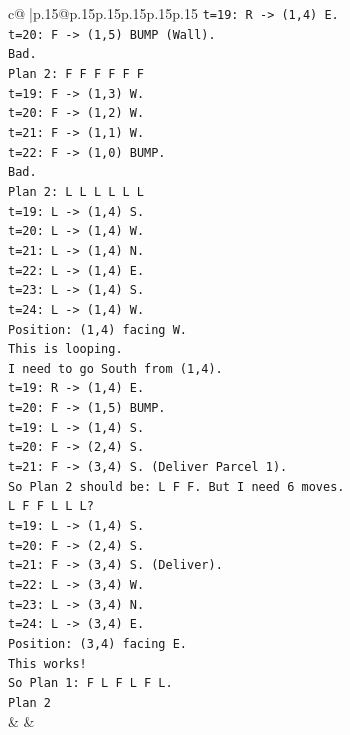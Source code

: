 \documentclass{article}
\begin{document}
{\begin{supertabular}{c@{$\;$}|p{.15\linewidth}@{}p{.15\linewidth}p{.15\linewidth}p{.15\linewidth}p{.15\linewidth}p{.15\linewidth}}
{{{\texttt{t=19: R {-}> (1,4) E.} \\
\texttt{t=20: F {-}> (1,5) BUMP (Wall).} \\
\texttt{Bad.} \\
\texttt{Plan 2: F F F F F F} \\
\texttt{t=19: F {-}> (1,3) W.} \\
\texttt{t=20: F {-}> (1,2) W.} \\
\texttt{t=21: F {-}> (1,1) W.} \\
\texttt{t=22: F {-}> (1,0) BUMP.} \\
\texttt{Bad.} \\
\texttt{Plan 2: L L L L L L} \\
\texttt{t=19: L {-}> (1,4) S.} \\
\texttt{t=20: L {-}> (1,4) W.} \\
\texttt{t=21: L {-}> (1,4) N.} \\
\texttt{t=22: L {-}> (1,4) E.} \\
\texttt{t=23: L {-}> (1,4) S.} \\
\texttt{t=24: L {-}> (1,4) W.} \\
\texttt{Position: (1,4) facing W.} \\
\texttt{This is looping.} \\
\texttt{I need to go South from (1,4).} \\
\texttt{t=19: R {-}> (1,4) E.} \\
\texttt{t=20: F {-}> (1,5) BUMP.} \\
\texttt{t=19: L {-}> (1,4) S.} \\
\texttt{t=20: F {-}> (2,4) S.} \\
\texttt{t=21: F {-}> (3,4) S. (Deliver Parcel 1).} \\
\texttt{So Plan 2 should be: L F F. But I need 6 moves.} \\
\texttt{L F F L L L?} \\
\texttt{t=19: L {-}> (1,4) S.} \\
\texttt{t=20: F {-}> (2,4) S.} \\
\texttt{t=21: F {-}> (3,4) S. (Deliver).} \\
\texttt{t=22: L {-}> (3,4) W.} \\
\texttt{t=23: L {-}> (3,4) N.} \\
\texttt{t=24: L {-}> (3,4) E.} \\
\texttt{Position: (3,4) facing E.} \\
\texttt{This works!} \\
\texttt{So Plan 1: F L F L F L.} \\
\texttt{Plan 2} \\
            }
        }
    }
    & & \\ \\


\end{supertabular}}
\end{document}
